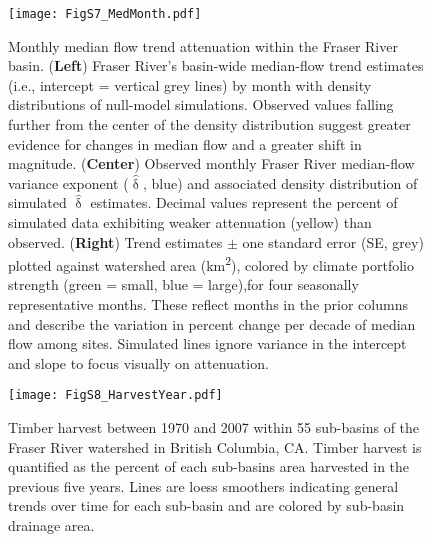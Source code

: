 \documentclass[draft,grl]{agutexSI}
\begin{document}
\begin{figure}[h]
	\centering
	\noindent\texttt{[image: FigS7\_MedMonth.pdf]}
	\caption{Monthly median flow trend attenuation within the Fraser River basin. (\textbf{Left}) Fraser River's basin-wide median-flow trend estimates (i.e., intercept = vertical grey lines) by month with density distributions of null-model simulations. Observed values falling further from the center of the density distribution suggest greater evidence for changes in median flow and a greater shift in magnitude. (\textbf{Center}) Observed monthly Fraser River median-flow variance exponent ($\hat{\updelta}$, blue) and associated density distribution of simulated $\hat{\updelta}$ estimates. Decimal values represent the percent of simulated data exhibiting weaker attenuation (yellow) than observed. (\textbf{Right}) Trend estimates $\pm$ one standard error (SE, grey) plotted against watershed area (km\textsuperscript{2}), colored by climate portfolio strength (green = small, blue = large),for four seasonally representative months. These reflect months in the prior columns and describe the variation in percent change per decade of median flow among sites. Simulated lines ignore variance in the intercept and slope to focus visually on attenuation.}
	\label{fig:S7}
\end{figure}

\begin{sidewaysfigure}[h]
	\centering
	\noindent\texttt{[image: FigS8\_HarvestYear.pdf]}
	\caption{Timber harvest between 1970 and 2007 within 55 sub-basins of the Fraser River watershed in British Columbia, CA. Timber harvest is quantified as the percent of each sub-basins area harvested in the previous five years. Lines are loess smoothers indicating general trends over time for each sub-basin and are colored by sub-basin drainage area.}
	\label{fig:S8}
\end{sidewaysfigure}
\end{document}
